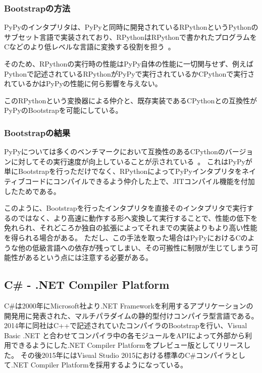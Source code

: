 \subsubsection{Bootstrapの方法}

PyPyのインタプリタは、PyPyと同時に開発されているRPythonというPythonのサブセット言語で実装されており、RPythonはRPythonで書かれたプログラムをCなどのより低レベルな言語に変換する役割を担う~\cite{rpython-doc}。

そのため、RPythonの実行時の性能はPyPy自体の性能に一切関与せず、例えばPythonで記述されているRPythonがPyPyで実行されているかCPythonで実行されているかはPyPyの性能に何ら影響を与えない。

このRPythonという変換器による仲介と、既存実装であるCPythonとの互換性がPyPyのBootstrapを可能にしている。


\subsubsection{Bootstrapの結果}

PyPyについては多くのベンチマークにおいて互換性のあるCPythonのバージョンに対してその実行速度が向上していることが示されている~\cite{speed-pypy-org}。
これはPyPyが単にBootstrapを行っただけでなく、RPythonによってPyPyインタプリタをネイティブコードにコンパイルできるよう仲介した上で、JITコンパイル機能を付加したためである。

このように、Bootstrapを行ったインタプリタを直接そのインタプリタで実行するのではなく、より高速に動作する形へ変換して実行することで、性能の低下を免れられ、それどころか独自の拡張によってそれまでの実装よりもより高い性能を得られる場合がある。
ただし、この手法を取った場合はPyPyにおけるCのような他の低級言語への依存が残ってしまい、その可搬性に制限が生じてしまう可能性があるという点には注意する必要がある。


\subsection{C\# - .NET Compiler Platform}
\label{side-effect:instance:csharp}

C\#は2000年にMicrosoft社より.NET Frameworkを利用するアプリケーションの開発用に発表された、マルチパラダイムの静的型付けコンパイラ型言語である。
2014年に同社はC++で記述されていたコンパイラのBootstrapを行い、Visual Basic .NET と合わせてコンパイラ中の各モジュールをAPIによって外部から利用できるようにした.NET Compiler Platformをプレビュー版としてリリースした。
その後2015年にはVisual Studio 2015における標準のC\#コンパイラとして.NET Compiler Platformを採用するようになっている。~\cite{roslyn}

